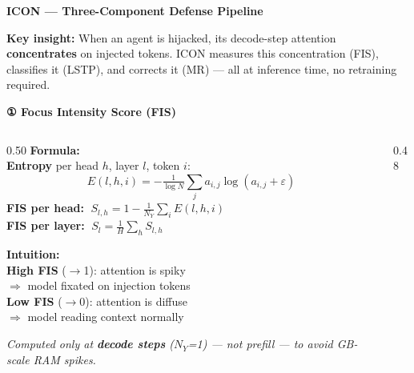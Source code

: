 \documentclass[aspectratio=169]{beamer}
\begin{document}
\begin{frame}{\textcolor{cmindsblue}{\textbf{ICON — Three-Component Defense Pipeline}}}
  \vspace{-0.5cm}
  
  \vspace{-0.3cm}
  {\scriptsize
  \textbf{Key insight:} When an agent is hijacked, its decode-step attention
  \textbf{concentrates} on injected tokens. ICON measures this concentration
  (FIS), classifies it (LSTP), and corrects it (MR) — all at inference time,
  no retraining required.
  }
\end{frame}


\begin{frame}{\textcolor{cmindsblue}{\textbf{① Focus Intensity Score (FIS)}}}
  \vspace{-0.3cm}
  \begin{columns}[T]
    \begin{column}{0.50\textwidth}
      \textcolor{cmindsblue}{\textbf{Formula:}}\\[4pt]
      {\small
      \textbf{Entropy} per head $h$, layer $l$, token $i$:
      \[
        E(l,h,i) = -\tfrac{1}{\log N}\sum_j a_{i,j}\log(a_{i,j}+\varepsilon)
      \]
      \textbf{FIS per head:} $\;S_{l,h} = 1 - \frac{1}{N_Y}\sum_i E(l,h,i)$\\[4pt]
      \textbf{FIS per layer:} $\;S_l = \frac{1}{H}\sum_h S_{l,h}$
      }
      \vspace{3mm}

      \textcolor{cmindsblue}{\textbf{Intuition:}}\\
      {\small
      \textbf{High FIS} ($\to$1): attention is spiky\\
      $\Rightarrow$ model fixated on injection tokens\\[2pt]
      \textbf{Low FIS} ($\to$0): attention is diffuse\\
      $\Rightarrow$ model reading context normally
      }
      \vspace{3mm}

      {\scriptsize
      \textit{Computed only at \textbf{decode steps} ($N_Y$=1) —
      not prefill — to avoid GB-scale RAM spikes.}}
    \end{column}

    \begin{column}{0.48\textwidth}
      \vspace{0.5cm}
      
    \end{column}
  \end{columns}
\end{frame}
\end{document}
